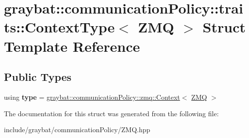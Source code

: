 \hypertarget{structgraybat_1_1communicationPolicy_1_1traits_1_1ContextType_3_01ZMQ_01_4}{}\section{graybat\+:\+:communication\+Policy\+:\+:traits\+:\+:Context\+Type$<$ Z\+M\+Q $>$ Struct Template Reference}
\label{structgraybat_1_1communicationPolicy_1_1traits_1_1ContextType_3_01ZMQ_01_4}
\subsection*{Public Types}
\begin{DoxyCompactItemize}
\item 
\hypertarget{structgraybat_1_1communicationPolicy_1_1traits_1_1ContextType_3_01ZMQ_01_4_a91a45492fd9cb43b37aa4b826ad74060}{}using {\bfseries type} = \hyperlink{classgraybat_1_1communicationPolicy_1_1zmq_1_1Context}{graybat\+::communication\+Policy\+::zmq\+::\+Context}$<$ \hyperlink{structgraybat_1_1communicationPolicy_1_1ZMQ}{Z\+M\+Q} $>$\label{structgraybat_1_1communicationPolicy_1_1traits_1_1ContextType_3_01ZMQ_01_4_a91a45492fd9cb43b37aa4b826ad74060}

\end{DoxyCompactItemize}


The documentation for this struct was generated from the following file\+:\begin{DoxyCompactItemize}
\item 
include/graybat/communication\+Policy/Z\+M\+Q.\+hpp\end{DoxyCompactItemize}
